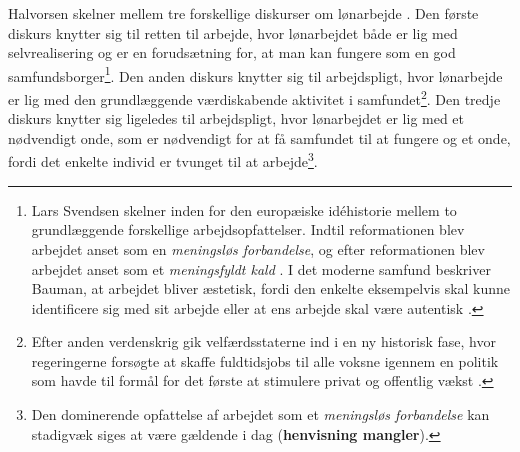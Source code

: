 Halvorsen skelner mellem tre forskellige diskurser om lønarbejde \parencite[13]{Halvorsen1999}. Den første diskurs knytter sig til retten til arbejde, hvor lønarbejdet både er lig med selvrealisering og er en forudsætning for, at man kan fungere som en god samfundsborger\footnote{Lars Svendsen skelner inden for den europæiske idéhistorie mellem to grundlæggende forskellige arbejdsopfattelser. Indtil reformationen blev arbejdet anset som en \textit{meningsløs forbandelse}, og efter reformationen blev arbejdet anset som et \textit{meningsfyldt kald} \parencite[13]{Svendsen2008}. I det moderne samfund beskriver Bauman, at arbejdet bliver æstetisk, fordi den enkelte eksempelvis skal kunne identificere sig med sit arbejde eller at ens arbejde skal være autentisk \textbf{\parencite[169-215]{Baum2006}}.}. Den anden diskurs knytter sig til arbejdspligt, hvor lønarbejde er lig med den grundlæggende værdiskabende aktivitet i samfundet\footnote{Efter anden verdenskrig gik velfærdsstaterne ind i en ny historisk fase, hvor regeringerne forsøgte at skaffe fuldtidsjobs til alle voksne igennem en politik som havde til formål for det første at stimulere privat og offentlig vækst \parencite[17]{Keane1986}.}. Den tredje diskurs knytter sig ligeledes til arbejdspligt, hvor lønarbejdet er lig med et nødvendigt onde, som er nødvendigt for at få samfundet til at fungere og et onde, fordi det enkelte individ er tvunget til at arbejde\footnote{Den dominerende opfattelse af arbejdet som et \textit{meningsløs forbandelse} \parencite[13]{Svendsen2008} kan stadigvæk siges at være gældende i dag (\textbf{henvisning mangler}).}.

